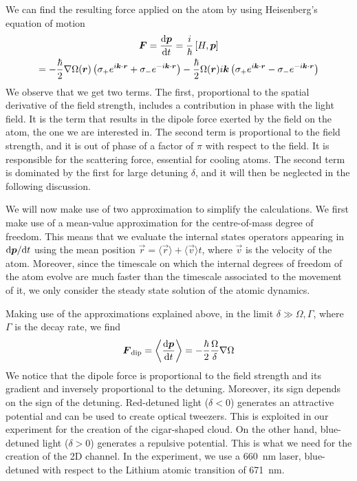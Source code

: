 We can find the resulting force applied on the atom by using Heisenberg's equation of motion
\begin{multline}
    \vec{F} = \frac{\differential\vec{p}}{\differential t} = \frac{i}{\hbar} \left[ H, \vec{p} \right] \\= - \frac{\hbar}{2} \nabla \Omega(\vec{r}) \left( \sigma_+ e^{i\vec{k}\cdot \vec{r}} +  \sigma_{-} e^{-i\vec{k}\cdot \vec{r} } \right) - \frac{\hbar
    }{2} \Omega(\vec{r}) i \vec{k} \left( \sigma_+ e^{i\vec{k}\cdot \vec{r}} -  \sigma_{-} e^{-i\vec{k}\cdot \vec{r} } \right)
\end{multline}
We observe that we get two terms. The first, proportional to the spatial derivative of the field strength, includes a contribution in phase with the light field. It is the term that results in the dipole force exerted by the field on the atom, the one we are interested in. The second term is proportional to the field strength, and it is out of phase of a factor of $\pi$ with respect to the field. It is responsible for the scattering force, essential for cooling atoms. The second term is dominated  by the first for large detuning $\delta$, and it will then be neglected in the following discussion.

We will now make use of two approximation to simplify the calculations. We first make use of a mean-value approximation for the centre-of-mass degree of freedom. This means that we evaluate the internal states operators appearing in $\differential \vec{p} / \differential t$ using the mean position $\vec{r} = \langle \vec{r} \rangle + \langle \vec{v} \rangle t$, where $\vec{v}$ is the velocity of the atom. Moreover, since the timescale on which the internal degrees of freedom of the atom evolve are much faster than the timescale associated to the movement of it, we only consider the steady state solution of the atomic dynamics.

Making use of the approximations explained above, in the limit $\delta  \gg \Omega, \Gamma$, where $\Gamma$ is the decay rate, we find
\begin{equation}
    \vec{F}_\text{dip} = \left\langle \frac{\differential \vec{p}}{\differential t} \right\rangle = - \frac{\hbar}{2} \frac{\Omega}{\delta} \nabla \Omega
\end{equation}
We notice that the dipole force is proportional to the field strength and its gradient and inversely proportional to the detuning. Moreover, its sign depends on the sign of the detuning. Red-detuned light ($\delta < 0$) generates an attractive potential and can be used to create optical tweezers. This is exploited in our experiment for the creation of the cigar-shaped cloud. On the other hand, blue-detuned light ($\delta > 0$) generates a repulsive potential. This is what we need for the creation of the 2D channel. In the experiment, we use a \SI{660}{nm} laser, blue-detuned with respect to the Lithium atomic transition of \SI{671}{nm}.

